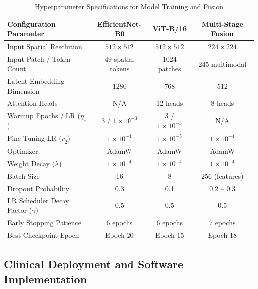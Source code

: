 \documentclass[journal]{IEEEtran}
\begin{document}
\begin{table}[!t]
\renewcommand{\arraystretch}{1.2}
\caption{Hyperparameter Specifications for Model Training and Fusion}
\label{tab:hyperparameters}
\centering
\begin{tabular}{lccc}
\toprule
\textbf{Configuration Parameter} & \textbf{EfficientNet-B0} & \textbf{ViT-B/16} & \textbf{Multi-Stage Fusion} \\
\midrule
Input Spatial Resolution & $512 \times 512$ & $512 \times 512$ & $224 \times 224$ \\
Input Patch / Token Count & 49 spatial tokens & 1024 patches & 245 multimodal \\
Latent Embedding Dimension & 1280 & 768 & 512 \\
Attention Heads & N/A & 12 heads & 8 heads \\
Warmup Epochs / LR ($\eta_1$) & 3 / $1 \times 10^{-3}$ & 3 / $1 \times 10^{-3}$ & N/A \\
Fine-Tuning LR ($\eta_2$) & $1 \times 10^{-4}$ & $1 \times 10^{-5}$ & $1 \times 10^{-4}$ \\
Optimizer & AdamW & AdamW & AdamW \\
Weight Decay ($\lambda$) & $1 \times 10^{-4}$ & $1 \times 10^{-4}$ & $1 \times 10^{-4}$ \\
Batch Size & 16 & 8 & 256 (features) \\
Dropout Probability & 0.3 & 0.1 & 0.2 -- 0.3 \\
LR Scheduler Decay Factor ($\gamma$) & 0.5 & 0.5 & 0.5 \\
Early Stopping Patience & 6 epochs & 6 epochs & 7 epochs \\
Best Checkpoint Epoch & Epoch 20 & Epoch 15 & Epoch 18 \\
\bottomrule
\end{tabular}
\end{table}

\subsection{Clinical Deployment and Software Implementation}
\label{subsec:implementation}
\end{document}
